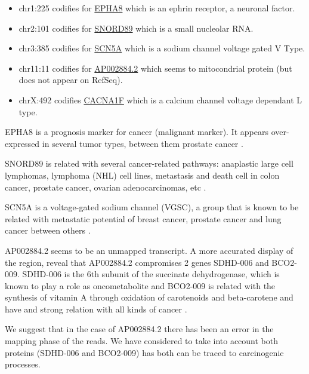 \documentclass[9pt,twocolumn,twoside]{gsajnl}
\begin{document}
\begin{itemize}
\item chr1:225 codifies for \href{http://www.genecards.org/cgi-bin/carddisp.pl?gene=EPHA8}{EPHA8} which is an ephrin receptor, a neuronal factor.
\item chr2:101 codifies for \href{http://www.genecards.org/cgi-bin/carddisp.pl?gene=SNORD89}{SNORD89} which is a small nucleolar RNA.
\item chr3:385 codifies for \href{http://www.genecards.org/cgi-bin/carddisp.pl?gene=SCN5A}{SCN5A} which is a sodium channel voltage gated V Type.
\item chr11:11 codifies for \href{http://www.ensembl.org/Homo_sapiens/Gene/Summary?g=ENSG00000255292;r=11:112086903-112193805}{AP002884.2} which seems to mitocondrial protein (but does not appear on RefSeq).
\item chrX:492 codifies \href{http://www.genecards.org/cgi-bin/carddisp.pl?gene=CACNA1F}{CACNA1F} which is a calcium channel voltage dependant L type.
\end{itemize}

EPHA8 is a prognosis marker for cancer (malignant marker). It appears over-expressed in several tumor types, between them prostate cancer \cite{proteinatlas,uhlen2015tissue}.

SNORD89 is related with several cancer-related pathways:  anaplastic large cell lymphomas, lymphoma (NHL) cell lines, metastasis and death cell in colon cancer, prostate cancer, ovarian adenocarcinomas, etc \cite{tcng}.

SCN5A is a voltage-gated sodium channel (VGSC), a group that is known to be related with metastatic potential of breast cancer, prostate cancer and lung cancer between others \cite{Nelson2015}.

AP002884.2 seems to be an unmapped transcript. A more accurated display of the region, reveal that AP002884.2 compromises 2 genes SDHD-006 and BCO2-009. SDHD-006 is the 6th subunit of the succinate dehydrogenase, which is known to play a role as oncometabolite \cite{oncometabolites} and BCO2-009 is related with the synthesis of vitamin A through oxidation of carotenoids  and beta-carotene and have and strong relation with all kinds of cancer \cite{proteinatlas,uhlen2015tissue}.

We suggest that in the case of AP002884.2 there has been an error in the mapping phase of the reads. We have considered to take into account both proteins (SDHD-006 and BCO2-009) has both can be traced to carcinogenic processes.
\end{document}

